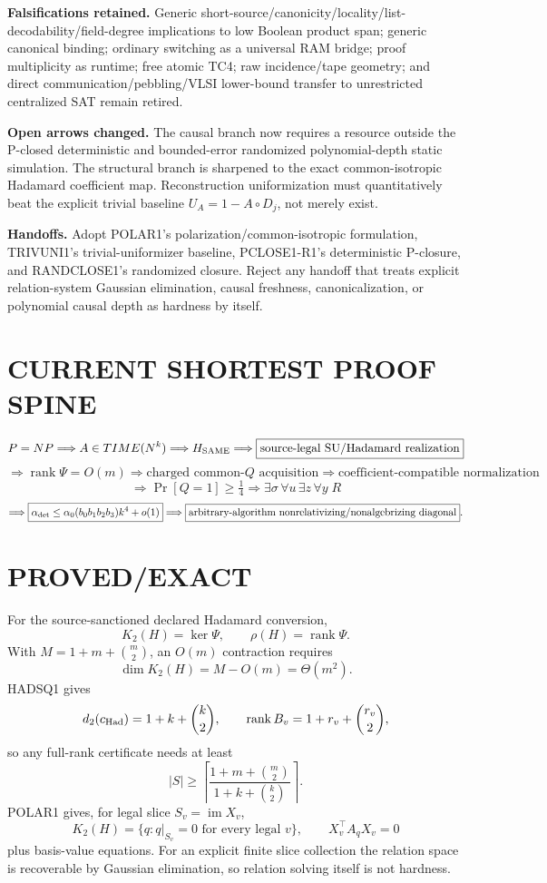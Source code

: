 \documentclass[11pt]{article}
\begin{document}
\textbf{Falsifications retained.} Generic short-source/canonicity/locality/list-decodability/field-degree implications to low Boolean product span; generic canonical binding; ordinary switching as a universal RAM bridge; proof multiplicity as runtime; free atomic TC4; raw incidence/tape geometry; and direct communication/pebbling/VLSI lower-bound transfer to unrestricted centralized SAT remain retired.

\textbf{Open arrows changed.} The causal branch now requires a resource outside the P-closed deterministic and bounded-error randomized polynomial-depth static simulation. The structural branch is sharpened to the exact common-isotropic Hadamard coefficient map. Reconstruction uniformization must quantitatively beat the explicit trivial baseline \(U_A=1-A\circ D_j\), not merely exist.

\textbf{Handoffs.} Adopt POLAR1's polarization/common-isotropic formulation, TRIVUNI1's trivial-uniformizer baseline, PCLOSE1-R1's deterministic P-closure, and RANDCLOSE1's randomized closure. Reject any handoff that treats explicit relation-system Gaussian elimination, causal freshness, canonicalization, or polynomial causal depth as hardness by itself.

\section*{CURRENT SHORTEST PROOF SPINE}
\[
P=NP\Longrightarrow A\in TIME(N^k)\Longrightarrow H_{\rm SAME}
\Longrightarrow \boxed{\text{source-legal SU/Hadamard realization}}
\]
\[
\Longrightarrow \boxed{\operatorname{rank}\Psi=O(m)}
\Longrightarrow \boxed{\text{charged common-}Q\text{ acquisition}}
\Longrightarrow \boxed{\text{coefficient-compatible normalization}}
\]
\[
\Longrightarrow \Pr[Q=1]\ge\tfrac14
\Longrightarrow \boxed{\exists\sigma\,\forall u\,\exists z\,\forall y\;R}
\]
\[
\Longrightarrow
\boxed{\alpha_{\rm det}\le\alpha_0(b_0b_1b_2b_3)k^4+o(1)}
\Longrightarrow
\boxed{\text{arbitrary-algorithm nonrelativizing/nonalgebrizing diagonal}}.
\]

\section*{PROVED/EXACT}
For the source-sanctioned declared Hadamard conversion,
\[
K_2(H)=\ker\Psi,\qquad \rho(H)=\operatorname{rank}\Psi.
\]
With \(M=1+m+\binom m2\), an \(O(m)\) contraction requires
\[
\dim K_2(H)=M-O(m)=\Theta(m^2).
\]
HADSQ1 gives
\[
d_2(c_{\rm Had})=1+k+\binom k2,
\qquad
\operatorname{rank}B_v=1+r_v+\binom{r_v}{2},
\]
so any full-rank certificate needs at least
\[
|S|\ge\left\lceil\frac{1+m+\binom m2}{1+k+\binom k2}\right\rceil.
\]
POLAR1 gives, for legal slice \(S_v=\operatorname{im}X_v\),
\[
K_2(H)=\{q:q|_{S_v}=0\text{ for every legal }v\},
\qquad
X_v^\top A_qX_v=0
\]
plus basis-value equations. For an explicit finite slice collection the relation space is recoverable by Gaussian elimination, so relation solving itself is not hardness.
\end{document}
